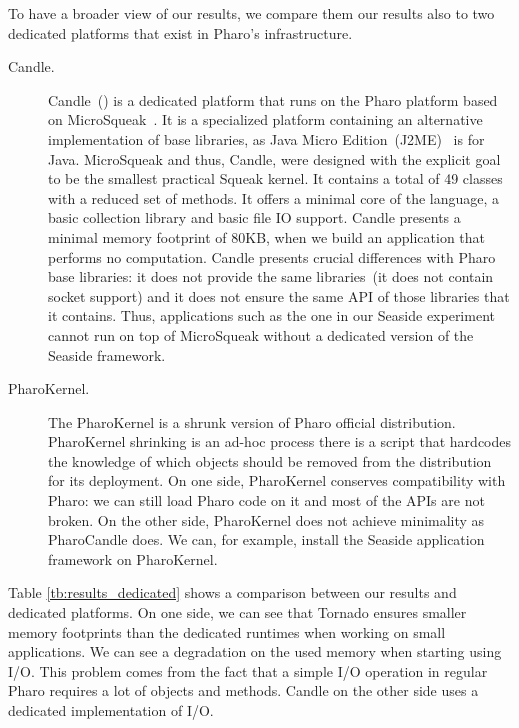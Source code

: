To have a broader view of our results, we compare them our results also to two dedicated platforms that exist in Pharo's infrastructure.

\begin{description}
\item[Candle.] Candle~() is a dedicated platform that runs on the Pharo platform based on MicroSqueak~\cite{Malo11a}. It is a specialized platform containing an alternative implementation of base libraries, as Java Micro Edition~(J2ME)~\cite{JavaME} is for Java. MicroSqueak and thus, Candle, were designed with the explicit goal to be the smallest practical Squeak kernel. It contains a total of 49 classes with a reduced set of methods. It offers a minimal core of the language, a basic collection library and basic file IO support. Candle presents a minimal memory footprint of 80KB, when we build an application that performs no computation.
Candle presents crucial differences with Pharo base libraries: it does not provide the same libraries~(\eg it does not contain socket support) and it does not ensure the same API of those libraries that it contains. Thus, applications such as the one in our Seaside experiment cannot run on top of MicroSqueak without a dedicated version of the Seaside framework.

\item[PharoKernel.] The PharoKernel is a shrunk version of Pharo official distribution. PharoKernel shrinking is an ad-hoc process \ie there is a script that hardcodes the knowledge of which objects should be removed from the distribution for its deployment. On one side, PharoKernel conserves compatibility with Pharo: we can still load Pharo code on it and most of the APIs are not broken. On the other side, PharoKernel does not achieve minimality as PharoCandle does. We can, for example, install the Seaside application framework on PharoKernel.

\end{description}

Table \ref{tb:results_dedicated} shows a comparison between our results and dedicated platforms. On one side, we can see that Tornado ensures smaller memory footprints than the dedicated runtimes when working on small applications. We can see a degradation on the used memory when starting using I/O. This problem comes from the fact that a simple I/O operation in regular Pharo requires a lot of objects and methods. Candle on the other side uses a dedicated implementation of I/O.


